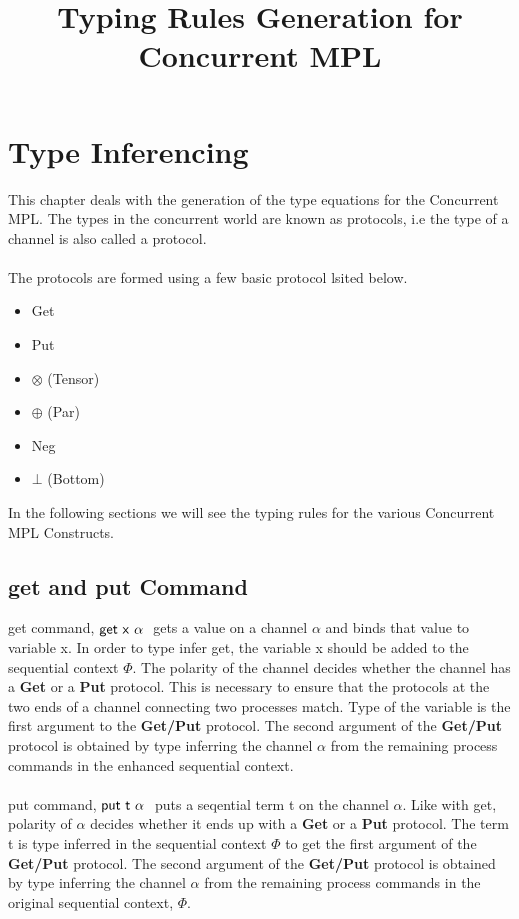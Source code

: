 \documentclass[11pt]{article}
\title{Typing Rules Generation for Concurrent MPL}
\newcommand{\get}{\ensuremath{{\sf get ~ x ~\alpha~}}\xspace}
\newcommand{\putC}{\ensuremath{{\sf put ~ t ~\alpha~}}\xspace}
\begin{document}
\maketitle

\section{Type Inferencing}
This chapter deals with the generation of the type equations for the Concurrent MPL. The types in the concurrent world are known as protocols, i.e the type of a channel is also called a protocol.
~~\\~~\\
The protocols are formed using a few basic protocol lsited below.
\begin {itemize}
  \item Get
  \item Put
  \item $\otimes$ (Tensor)
  \item $\oplus$ (Par)
  \item Neg
  \item $\bot$ (Bottom)
\end   {itemize} 
 
In the following sections we will see the typing rules for the various Concurrent MPL Constructs.



\subsection {get and put Command}
 {\sf get} command, $\get$ gets a value on a channel $\alpha$ and binds that value to variable x.
In order to type infer {\sf get}, the variable x should be added to the sequential context $\Phi$. The polarity of the channel decides whether the channel has a {\bf Get} or a {\bf Put} protocol. This is necessary to ensure that the protocols at the two ends of a channel connecting two processes match. Type of the variable is the first argument to the {\bf Get/Put} protocol. The second argument of the {\bf Get/Put} protocol is obtained by type inferring the channel $\alpha$ from the remaining process commands in the enhanced sequential context. 
~~\\~~\\
{\sf put} command, $\putC$ puts a seqential term t on the channel $\alpha$. Like with {\sf get}, polarity of $\alpha $ decides whether it ends up with a {\bf Get} or a {\bf Put} protocol. The term t is type inferred in the sequential context $\Phi$ to get the first argument of the {\bf Get/Put} protocol. The second argument of the {\bf Get/Put} protocol is obtained by type inferring the channel $\alpha$ from the remaining process commands in the original sequential context, $\Phi$.  
\end{document}
